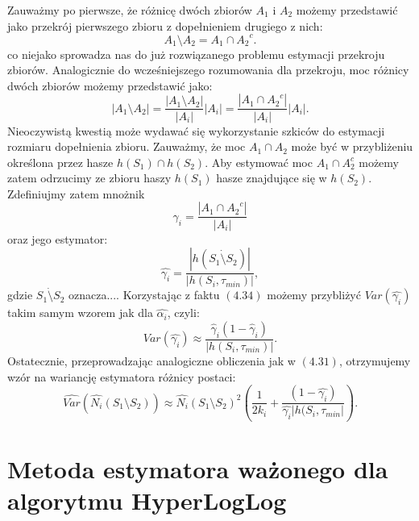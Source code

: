 Zauważmy po pierwsze, że różnicę dwóch zbiorów $A_1$ i $A_2$ możemy przedstawić jako przekrój pierwszego zbioru z dopełnieniem drugiego z nich:
\begin{equation}
    A_1 \setminus A_2 = A_1 \cap {A_2}^{c}.
\end{equation}
co niejako sprowadza nas do już rozwiązanego problemu estymacji przekroju zbiorów.
Analogicznie do wcześniejszego rozumowania  dla przekroju, moc różnicy dwóch zbiorów możemy przedstawić jako:
\begin{equation}
    |A_1 \setminus A_2| = \frac{|A_1 \setminus A_2|}{|A_i|}|A_i| = \frac{|A_1 \cap {A_2}^{c}|}{|A_i|}|A_i|.
\end{equation}
Nieoczywistą kwestią może wydawać się wykorzystanie szkiców do estymacji rozmiaru dopełnienia zbioru.
Zauważmy, że moc $A_1 \cap A_2$ może być w przybliżeniu określona przez hasze $h(S_1) \cap h(S_2)$.
Aby estymować moc  $A_1 \cap A_2^c$ możemy zatem odrzucimy ze zbioru haszy $h(S_1)$ hasze znajdujące się w $h(S_2)$.
Zdefiniujmy zatem mnożnik $${\gamma}_{i} = \frac{|A_1 \cap {A_2}^{c}|}{|A_i|}$$
oraz jego estymator:
\begin{equation}
    \hat{{\gamma}_i} = \frac{|h(S_1 \dot{\setminus} S_2)|}{|h(S_i, {\tau}_{min})|},
\end{equation}
gdzie $S_1 \dot{\setminus} S_2$ oznacza....
 Korzystając z faktu $(4.34)$
możemy przybliżyć $Var(\hat{{\gamma}_i})$ takim samym wzorem jak dla $\hat{{\alpha}_i}$, czyli:
\begin{equation}
    Var(\hat{{\gamma}_i}) \approx \frac{{\hat{\gamma}}_i(1 - {\hat{\gamma}}_i)}{|h(S_i, {\tau}_{min})|}.
\end{equation}
Ostatecznie, przeprowadzając analogiczne obliczenia jak w $(4.31)$,
 otrzymujemy wzór na wariancję estymatora różnicy postaci:
\begin{equation}
    \hat{Var}(\hat{N_i}(S_1 \setminus S_2)) \approx \hat{N_i}(S_1 \setminus S_2)^{2}(\frac{1}{2{k}_i} + \frac{(1 - \hat{{\gamma}_i})}{\hat{{\gamma}_i}|h(S_i, {\tau}_{min}|}).
\end{equation}

\section{Metoda estymatora ważonego dla algorytmu HyperLogLog}

